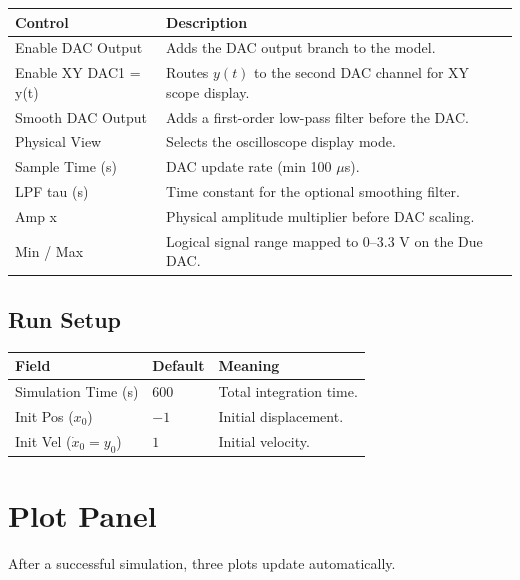 \documentclass[12pt,a4paper]{article}
\begin{document}
\begin{center}
\begin{tabular}{lp{10cm}}
\toprule
\textbf{Control} & \textbf{Description}\\
\midrule
Enable DAC Output    & Adds the DAC output branch to the model.\\
Enable XY DAC1 = y(t) & Routes $y(t)$ to the second DAC channel for XY scope display.\\
Smooth DAC Output    & Adds a first-order low-pass filter before the DAC.\\
Physical View        & Selects the oscilloscope display mode.\\
Sample Time (s)      & DAC update rate (min 100 $\mu$s).\\
LPF tau (s)          & Time constant for the optional smoothing filter.\\
Amp x                & Physical amplitude multiplier before DAC scaling.\\
Min / Max            & Logical signal range mapped to 0--3.3 V on the Due DAC.\\
\bottomrule
\end{tabular}
\end{center}

\subsection{Run Setup}

\begin{center}
\begin{tabular}{llp{7cm}}
\toprule
\textbf{Field} & \textbf{Default} & \textbf{Meaning}\\
\midrule
Simulation Time (s) & 600   & Total integration time.\\
Init Pos ($x_0$)    & $-1$  & Initial displacement.\\
Init Vel ($\dot{x}_0 = y_0$) & $1$ & Initial velocity.\\
\bottomrule
\end{tabular}
\end{center}

\section{Plot Panel}

After a successful simulation, three plots update automatically.
\end{document}
